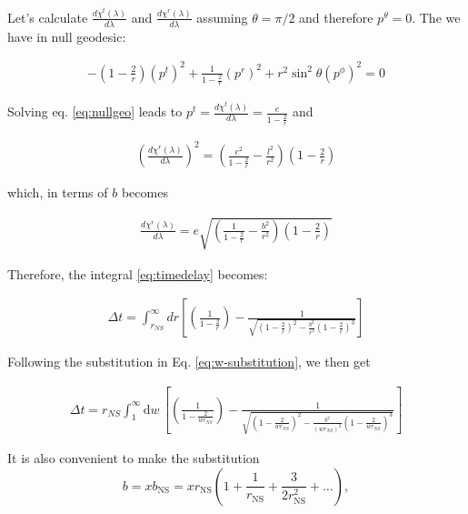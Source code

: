 \documentclass[modern]{aastex631}
\newcommand{\bNS}{b_\mathrm{NS}}
\newcommand{\rNS}{r_\mathrm{NS}}
\begin{document}
Let's calculate $\frac{d\chi^t(\lambda)}{d\lambda}$ and $\frac{d\chi^r(\lambda)}{d\lambda}$ assuming $\theta=\pi/2$ and therefore $p^\theta = 0$. The we have
in null geodesic:
%
\begin{linenomath}\begin{align}
    \label{eq:nullgeo}
    -(1-\frac{2}{r})(p^t)^2 + \frac{1}{1-\frac{2}{r}}(p^r)^2 + r^2\sin^2 \theta (p^\phi)^2 = 0
\end{align}\end{linenomath}
%
Solving eq. \ref{eq:nullgeo} leads to $p^t = \frac{d\chi^t(\lambda)}{d\lambda} = \frac{e}{1-\frac{2}{r}}$ and 
%
\begin{linenomath}\begin{align}
    \label{eq:pr-squared}
    \left(\frac{d\chi^r(\lambda)}{d\lambda}\right)^2 = \left(\frac{e^2}{1-\frac{2}{r}} - \frac{l^2}{r^2}\right) \left(1-\frac{2}{r}\right)
\end{align}\end{linenomath}
%
which, in terms of $b$ becomes
%
\begin{linenomath}\begin{align}
    \label{eq:pr-b}
    \frac{d\chi^r(\lambda)}{d\lambda} = e\sqrt{\left(\frac{1}{1-\frac{2}{r}} - \frac{b^2}{r^2}\right) \left(1-\frac{2}{r}\right)}
\end{align}\end{linenomath}
%
Therefore, the integral \ref{eq:timedelay} becomes:
%
\begin{linenomath}\begin{align}
    \label{eq:timedelayfull}
    \Delta t = \int_{r_{NS}}^{\infty} dr \left[\left(\frac{1}{1-\frac{2}{r}}\right) - \frac{1}{\sqrt{\left(1-\frac{2}{r}\right)^2 - \frac{b^2}{r^2}\left(1-\frac{2}{r}\right)^3}}\right]
\end{align}\end{linenomath}
%
Following the substitution in Eq. \ref{eq:w-substitution}, we then get
%
\begin{linenomath}\begin{align}
    \label{eq:tdelay-with-w}
    \Delta t = r_{NS} \int_{1}^{\infty} \mathrm{d} w \, \left[\left(\frac{1}{1-\frac{2}{wr_{NS}}}\right) - \frac{1}{\sqrt{\left(1-\frac{2}{wr_{NS}}\right)^2 - \frac{b^2}{(wr_{NS})^2}\left(1-\frac{2}{wr_{NS}}\right)^3}}\right]
\end{align}\end{linenomath}
%
It is also convenient to make the substitution 
\begin{equation}
    b = x \bNS = x \rNS \left( 1 + \frac{1}{\rNS} + \frac{3}{2 \rNS^2} + \ldots \right),
\end{equation}
\end{document}
